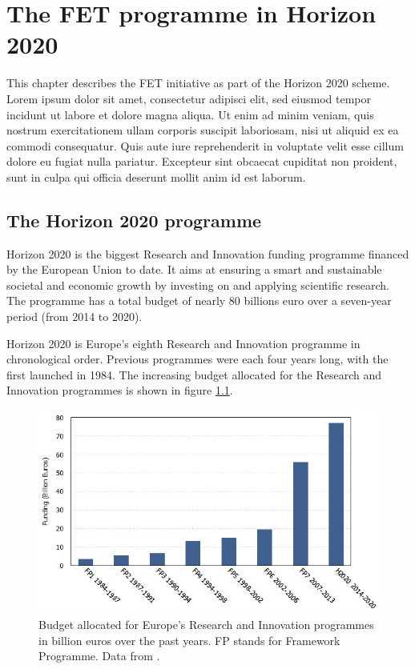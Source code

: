 \chapter{The FET programme in Horizon 2020}
This chapter describes the FET initiative as part of the Horizon 2020 scheme. Lorem ipsum dolor sit amet, consectetur adipisci elit, sed eiusmod tempor incidunt ut labore et dolore magna aliqua. Ut enim ad minim veniam, quis nostrum exercitationem ullam corporis suscipit laboriosam, nisi ut aliquid ex ea commodi consequatur. Quis aute iure reprehenderit in voluptate velit esse cillum dolore eu fugiat nulla pariatur. Excepteur sint obcaecat cupiditat non proident, sunt in culpa qui officia deserunt mollit anim id est laborum.

\section{The Horizon 2020 programme} \label{The_Horizon_2020_programme}
Horizon 2020 is the biggest Research and Innovation funding programme financed by the European Union to date. It aims at ensuring a smart and sustainable societal and economic growth by investing on and applying scientific research. The programme has a total budget of nearly 80 billions euro over a seven-year period (from 2014 to 2020).

Horizon 2020 is Europe's eighth Research and Innovation programme in chronological order. Previous programmes were each four years long, with the first launched in 1984. The increasing budget allocated for the Research and Innovation programmes is shown in figure \ref{FP_funds}.

\begin{figure}[!t] 
 \begin{center}
 \includegraphics[scale=0.4]{Images/FP_funds.jpg}
 \caption{Budget allocated for Europe's Research and Innovation programmes in billion euros over the past years. FP stands for Framework Programme. Data from \cite{OECD}.}
 \label{FP_funds}
 \end{center}
\end{figure}

